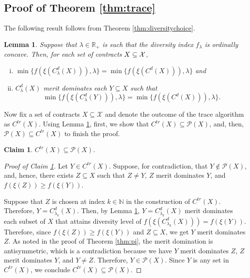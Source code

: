 \documentclass[12pt]{amsart}
\newtheorem{lemma}{Lemma}
\newtheorem{claim}{Claim}
\theoremstyle{remark}
\def\oconcave{ordinally concave} %
\begin{document}
\bigskip





\subsection*{Proof of Theorem \ref{thm:trace}}
The following result follows from Theorem \ref{thm:diversitychoice}.

\begin{lemma}\label{lem:lambdachoice}
Suppose that $\lambda\in \mathbb{R}_+$ is such that the diversity
index $f_{\lambda}$ is \oconcave{}. Then, for each set of contracts $X\subseteq \mathcal{X}$,
\begin{enumerate}[(i)]
\item $\min\{f(\xi(C^d_{\lambda}(X))),\lambda\}=\min\{f(\xi(C^d(X))),\lambda\}$ and
\item $C^d_{\lambda}(X)$ merit dominates each $Y\subseteq X$ such that
\[ \min\{f(\xi(C^d_{\lambda}(Y))),\lambda\}=\min\{f(\xi(C^d(X))),\lambda\}.\]
\end{enumerate}
\end{lemma}

Now fix a set of contracts $X\subseteq \mathcal{X}$ and denote the outcome of
the trace algorithm as $C^{tr}(X)$. Using Lemma \ref{lem:lambdachoice}, first,
we show that $C^{tr}(X)\subseteq \mathcal{P}(X)$, and, then,
$\mathcal{P}(X) \subseteq C^{tr}(X)$ to finish the proof.

\begin{claim}\label{claim:pareto}
$C^{tr}(X)\subseteq \mathcal{P}(X)$.
\end{claim}

\begin{proof}[Proof of Claim \ref{claim:pareto}]\renewcommand{\qedsymbol}{$\blacksquare$}
Let $Y\in C^{tr}(X)$. Suppose, for contradiction, that $Y\notin \mathcal{P}(X)$, and, hence, there exists
$Z\subseteq X$ such that $Z\neq Y$, $Z$ merit dominates $Y$, and
$f(\xi(Z))\geq f(\xi(Y))$.

Suppose that $Z$ is chosen at index $k\in \mathbb{N}$ in the
construction of $C^{tr}(X)$. Therefore,
$Y=C^d_{\lambda_k}(X)$. Then, by Lemma \ref{lem:lambdachoice},
$Y=C^d_{\lambda_k}(X)$ merit dominates each subset of $X$ that attains diversity
level of $f(\xi(C^d_{\lambda_k}(X)))=f(\xi(Y))$. Therefore, since
$f(\xi(Z)) \geq f(\xi(Y))$ and $Z\subseteq X$, we get $Y$ merit dominates $Z$.
As noted in the proof of Theorem \ref{thm:pi}, the merit domination is
antisymmetric, which is a contradiction because we have
$Y$ merit dominates $Z$, $Z$ merit dominates $Y$, and $Y\neq Z$.
Therefore, $Y\in \mathcal{P}(X)$. Since $Y$ is any set in $C^{tr}(X)$,
we conclude $C^{tr}(X) \subseteq \mathcal{P}(X)$.
\end{proof}
\end{document}
